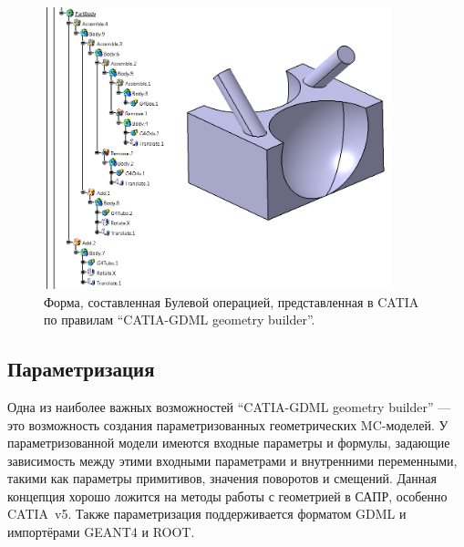 \begin{figure}[H]
\centering
\includegraphics[width=0.9\textwidth]{pictures/Boolean_example.png}
\caption{Форма, составленная Булевой операцией, представленная в CATIA по правилам ``CATIA-GDML geometry builder''.}
\label{fig:BooleanComplex}
\end{figure}


%                                                                                

\subsection{Параметризация}\label{sec:Parameterization}

Одна из наиболее важных возможностей ``CATIA-GDML geometry builder'' --- это возможность создания параметризованных геометрических MC-моделей. У параметризованной модели имеются входные параметры и формулы, задающие зависимость между этими входными параметрами и внутренними переменными, такими как параметры примитивов, значения поворотов и смещений. Данная концепция хорошо ложится на методы работы с геометрией в САПР, особенно CATIA~v5. Также параметризация поддерживается форматом GDML и импортёрами GEANT4 и ROOT.

